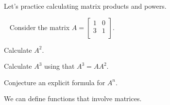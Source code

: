 Let's practice calculating matrix products and powers.

\begin{act}
\label{act_matrix_mult_powers}
~
    Consider the matrix $A=\left[ \begin{array}{cc} 1 & 0 \\ 3 & 1 \\ \end{array} \right]$.
      \begin{actpart}
          \item Calculate $A^2$.
          \item Calculate $A^3$ using that $A^3=AA^2.$
          \item Conjecture an explicit formula for $A^n$.
      \end{actpart}
\end{act}

We can define functions that involve matrices.

